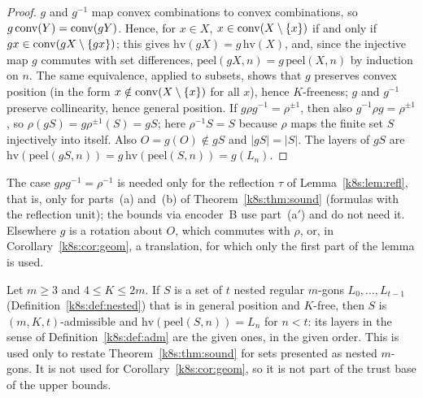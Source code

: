 \begin{proof}
$g$ and $g^{-1}$ map convex combinations to convex combinations, so $g\operatorname{conv}(Y)=\operatorname{conv}(gY)$. Hence, for $x\in X$,
$x\in\operatorname{conv}(X\setminus\{x\})$ if and only if $gx\in\operatorname{conv}(gX\setminus\{gx\})$; this gives $\mathrm{hv}(gX)=g\,\mathrm{hv}(X)$,
and, since the injective map $g$ commutes with set differences, $\mathrm{peel}(gX,n)=g\,\mathrm{peel}(X,n)$ by induction
on $n$. The same equivalence, applied to subsets, shows that $g$ preserves convex position (in the form
$x\notin\operatorname{conv}(X\setminus\{x\})$ for all $x$), hence $K$-freeness; $g$ and $g^{-1}$ preserve collinearity, hence general
position. If $g\rho g^{-1}=\rho^{\pm1}$, then also $g^{-1}\rho g=\rho^{\pm1}$, so $\rho(gS)=g\rho^{\pm1}(S)=gS$; here
$\rho^{-1}S=S$ because $\rho$ maps the finite set $S$ injectively into itself. Also $O=g(O)\notin gS$ and $|gS|=|S|$.
The layers of $gS$ are $\mathrm{hv}(\mathrm{peel}(gS,n))=g\,\mathrm{hv}(\mathrm{peel}(S,n))=g(L_n)$.
\end{proof}

The case $g\rho g^{-1}=\rho^{-1}$ is needed only for the reflection $\tau$ of Lemma~\ref{k8s:lem:refl}, that is, only
for parts~(a) and~(b) of Theorem~\ref{k8s:thm:sound} (formulas with the reflection unit); the bounds via encoder~B use
part~(a$'$) and do not need it. Elsewhere $g$ is a rotation about $O$, which commutes with $\rho$, or, in
Corollary~\ref{k8s:cor:geom}, a translation, for which only the first part of the lemma is used.

\begin{remark}\label{k8s:rem:ident}
Let $m\ge3$ and $4\le K\le2m$. If $S$ is a set of $t$ nested regular $m$-gons $L_0,\dots,L_{t-1}$
(Definition~\ref{k8s:def:nested}) that is in general position and $K$-free, then $S$ is $(m,K,t)$-admissible and
$\mathrm{hv}(\mathrm{peel}(S,n))=L_n$ for $n<t$: its layers in the sense of Definition~\ref{k8s:def:adm} are the given
ones, in the given order. This is used only to restate Theorem~\ref{k8s:thm:sound} for sets presented as nested
$m$-gons. It is not used for Corollary~\ref{k8s:cor:geom}, so it is not part of the trust base of the upper bounds.
\end{remark}

